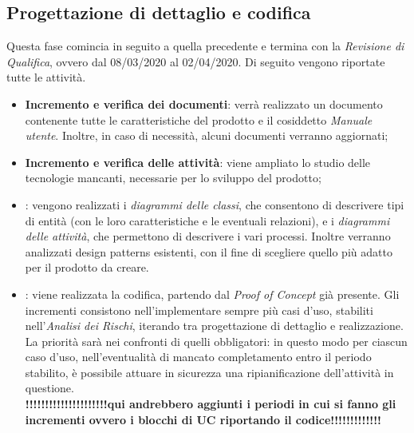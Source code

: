 \subsection{Progettazione di dettaglio e codifica}
Questa fase comincia in seguito a quella precedente e termina con la \textit{Revisione di Qualifica}, ovvero dal 08/03/2020 al 02/04/2020. Di seguito vengono riportate tutte le attività.

\begin{itemize}
	\item \textbf{Incremento e verifica dei documenti}: verrà realizzato un documento contenente tutte le caratteristiche del prodotto e il cosiddetto \textit{Manuale utente}. Inoltre, in caso di necessità, alcuni documenti verranno aggiornati;
	\item \textbf{Incremento e verifica delle attività}: viene ampliato lo studio delle tecnologie mancanti, necessarie per lo sviluppo del prodotto; 
	\item \textbf{}: vengono realizzati i \textit{diagrammi delle classi}, che consentono di descrivere tipi di entità (con le loro caratteristiche e le eventuali relazioni), e i \textit{diagrammi delle attività}, che permettono di descrivere i vari processi. Inoltre verranno analizzati design patterns esistenti, con il fine di scegliere quello più adatto per il prodotto da creare.
	\item \textbf{}: viene realizzata la codifica, partendo dal \textit{Proof of Concept} già presente. Gli incrementi consistono nell'implementare sempre più casi d'uso, stabiliti nell'\textit{Analisi dei Rischi}, iterando tra progettazione di dettaglio e realizzazione. La priorità sarà nei confronti di quelli obbligatori: in questo modo per ciascun caso d'uso, nell'eventualità di mancato completamento entro il periodo stabilito, è possibile attuare in sicurezza una ripianificazione dell'attività in questione. \\
\textbf{!!!!!!!!!!!!!!!!!!!!!qui andrebbero aggiunti i periodi in cui si fanno gli incrementi ovvero i blocchi di UC riportando il codice!!!!!!!!!!!!!}
\end{itemize}

